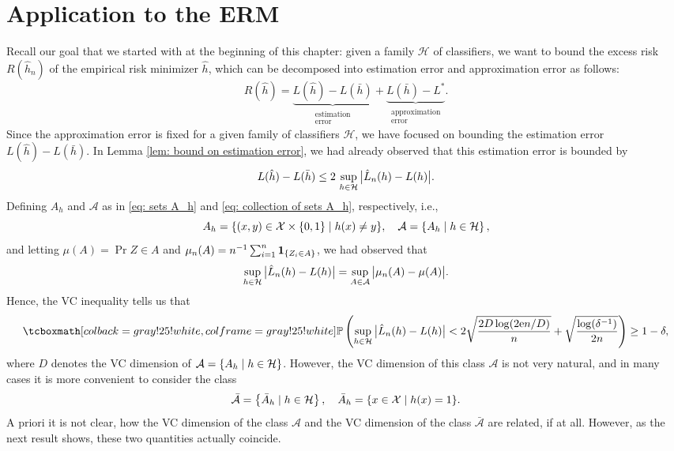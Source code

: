 \section{Application to the ERM}

Recall our goal that we started with at the beginning of this chapter: given a family $\mathcal{H}$ of classifiers, we want to bound the excess risk $R(\hat h_n)$ of the empirical risk minimizer $\hat h$, which can be decomposed into estimation error and approximation error as follows:
\[
    R(\hat h) = \underbrace{L(\hat h) - L(\bar h)}_{\substack{\text{estimation} \\ \text{error}}} + \underbrace{L(\bar h) - L^*}_{\substack{\text{approximation} \\ \text{error}}}.
\]
Since the approximation error is fixed for a given family of classifiers $\mathcal{H}$, we have focused on bounding the estimation error $L(\hat h) - L(\bar h)$. In Lemma \ref{lem: bound on estimation error}, we had already observed that this estimation error is bounded by
\[
    L(\hat h) - L(\bar h) \leq 2 \, \sup_{h \in \mathcal{H}} \big\lvert \hat L_n(h) - L(h) \big\rvert.
\]
Defining $A_h$ and $\mathcal{A}$ as in \eqref{eq: sets A_h} and \eqref{eq: collection of sets A_h}, respectively, i.e.,
\[
    A_h = \{ (x, y) \in \mathcal{X} \times \left\{0, 1\right\} \mathrel{|} h(x) \neq y \}, \quad \mathcal{A} = \left\{A_h \mathrel{|} h \in \mathcal{H}\right\},
\]
and letting $\mu(A) = \Pr{Z \in A}$ and $\mu_n(A) = n^{-1} \sum_{i=1}^n \mathbf{1}_{\left\{Z_i \in A\right\}}$, we had observed that
\[
    \sup_{h \in \mathcal{H}} \big\lvert \hat L_n(h) - L(h) \big\rvert = \sup_{A \in \mathcal{A}} \big\lvert \mu_n(A) - \mu(A) \big\rvert.
\]
Hence, the VC inequality tells us that
\begin{equation}
\label{eq: VC ineqaulity for ERM}
    \highlightMath{
        \Pr{ \sup_{h \in \mathcal{H}} \bigAbs{ \hat L_n(h) - L(h) } < 2 \sqrt{\frac{2D \log(2 \e n / D)}{n}} + \sqrt{\frac{\log(\delta^{-1})}{2n}} } \geq 1 - \delta,
    }
\end{equation}
where $D$ denotes the VC dimension of $\mathcal{A} = \left\{A_h \mathrel{|} h \in \mathcal{H}\right\}$. However, the VC dimension of this class $\mathcal{A}$ is not very natural, and in many cases it is more convenient to consider the class
\begin{equation}
\label{eq: collection of sets bar A_h}
    \bar{\mathcal{A}} = \left\{\bar A_h \mathrel{|} h \in \mathcal{H}\right\}, \quad \bar A_h = \{ x \in \mathcal{X} \mathrel{|} h(x) = 1 \}.
\end{equation}
A priori it is not clear, how the VC dimension of the class $\mathcal{A}$ and the VC dimension of the class $\bar{\mathcal{A}}$ are related, if at all. However, as the next result shows, these two quantities actually coincide.

